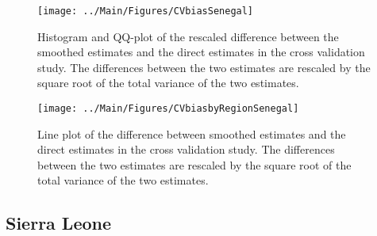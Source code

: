 \documentclass[12pt]{article}\usepackage[]{graphicx}\usepackage[]{color}
\newenvironment{knitrout}{}{} %
\begin{document}
\begin{knitrout}
\color{fgcolor}\begin{figure}[bht]

{\centering \texttt{[image: ../Main/Figures/CVbiasSenegal]} 

}

\caption[Histogram and QQ-plot of the rescaled difference between the smoothed estimates and the direct estimates in the cross validation study]{Histogram and QQ-plot of the rescaled difference between the smoothed estimates and the direct estimates in the cross validation study. The differences between the two estimates are rescaled by the square root of the total variance of the two estimates.}\label{fig:unnamed-chunk-289}
\end{figure}


\end{knitrout}

\begin{knitrout}
\color{fgcolor}\begin{figure}[bht]

{\centering \texttt{[image: ../Main/Figures/CVbiasbyRegionSenegal]} 

}

\caption[Line plot of the difference between smoothed estimates and the direct estimates in the cross validation study]{Line plot of the difference between smoothed estimates and the direct estimates in the cross validation study. The differences between the two estimates are rescaled by the square root of the total variance of the two estimates.}\label{fig:unnamed-chunk-290}
\end{figure}


\end{knitrout}


\clearpage
\subsection{Sierra Leone}


\end{document}
